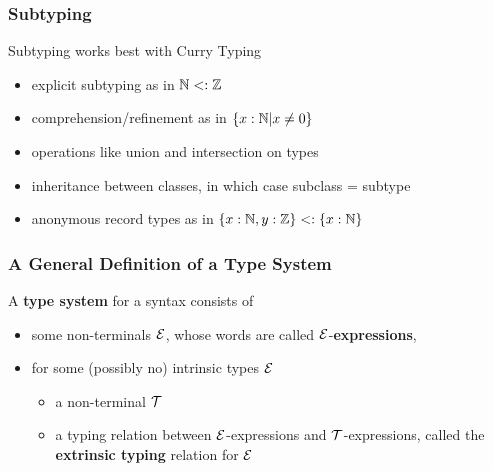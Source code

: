 \begin{frame}\frametitle{Subtyping}
Subtyping works best with Curry Typing
\begin{itemize}
 \item explicit subtyping as in $\mathbb{N}<:\mathbb{Z}$
 \item comprehension/refinement as in $\{x:\mathbb{N}|x\neq 0\}$
 \item operations like union and intersection on types
 \item inheritance between classes, in which case subclass = subtype
 \item anonymous record types as in $\{x:\mathbb{N},y:\mathbb{Z}\}<:\{x:\mathbb{N}\}$
\end{itemize}
\end{frame}

\begin{frame}\frametitle{A General Definition of a Type System}

A \textbf{type system} for a syntax consists of
\begin{itemize}
 \item some non-terminals $\mathcal{E}$, whose words are called $\mathcal{E}$-\textbf{expressions},
 \item for some (possibly no) intrinsic types $\mathcal{E}$
  \begin{itemize}
   \item a non-terminal $\mathcal{T}$ 
   \item a typing relation between $\mathcal{E}$-expressions and $\mathcal{T}$-expressions, called the \textbf{extrinsic typing} relation for $\mathcal{E}$
  \end{itemize}
\end{itemize}
\end{frame}

